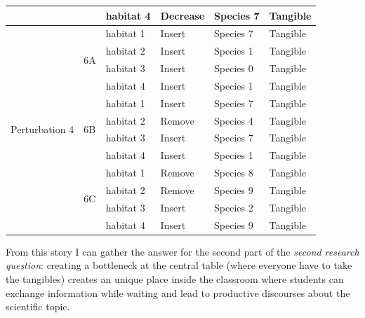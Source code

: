 \begin{table}
\begin{tabular}{ | l | l | l | l | l | l | }
 & & habitat 4 & Decrease & Species 7 & Tangible \\ 
\hline
\multirow{12}{*}{Perturbation 4} & \multirow{4}{*}{6A} & habitat 1 & Insert & Species 7 & Tangible \\
 & & habitat 2 & Insert & Species 1 & Tangible \\
 & & habitat 3 & Insert & Species 0 & Tangible \\
 & & habitat 4 & Insert & Species 1 & Tangible \\
\cline{2-6}
 & \multirow{4}{*}{6B} & habitat 1 & Insert & Species 7 & Tangible \\
 & & habitat 2 & Remove & Species 4 & Tangible \\
 & & habitat 3 & Insert & Species 7 & Tangible \\
 & & habitat 4 & Insert & Species 1 & Tangible \\ 
\cline{2-6}
 & \multirow{4}{*}{6C} & habitat 1 & Remove & Species 8 & Tangible \\
 & & habitat 2 & Remove & Species 9 & Tangible \\
 & & habitat 3 & Insert & Species 2 & Tangible \\
 & & habitat 4 & Insert & Species 9 & Tangible \\ 
\hline
\end{tabular}
\label{tab:perturbations}
\end{table}

From this story I can gather the answer for the second part of the \textit{second research question}: creating a bottleneck at the central table (where everyone have to take the tangibles) creates an unique place inside the classroom where students can exchange information while waiting and lead to productive discourses about the scientific topic.

